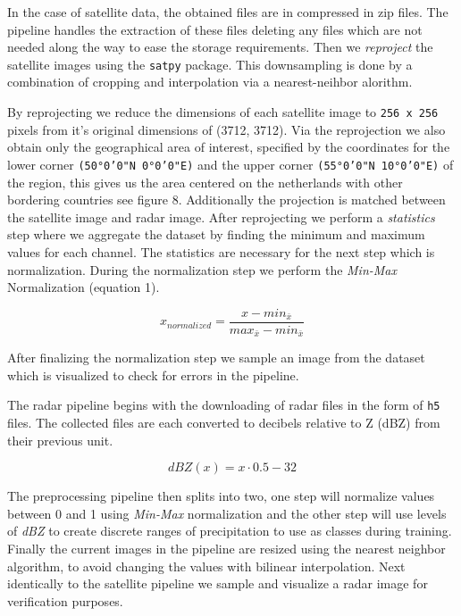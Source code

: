 In the case of satellite data, the obtained files are in compressed in zip files. The pipeline handles the extraction of these files deleting any files which are not needed along the way to ease the storage requirements.
Then we \textit{reproject} the satellite images using the \texttt{satpy} package. This downsampling is done by a combination of cropping and interpolation via a nearest-neihbor alorithm.

By reprojecting we reduce the dimensions of each satellite image to \texttt{256 x 256} pixels from it's original dimensions of (3712, 3712).
Via the reprojection we also obtain only the geographical area of interest, specified by the coordinates for the lower corner \texttt{(50°0'0"N 0°0'0"E)} and the upper corner \texttt{(55°0'0"N 10°0'0"E)} of the region, this gives us
the area centered on the netherlands with other bordering countries see figure 8.
Additionally the projection is matched between the satellite image and radar image.
After reprojecting we perform a \textit{statistics} step where we aggregate the dataset by finding the minimum and maximum values for each channel.
The statistics are necessary for the next step which is normalization. During the normalization step we perform the \textit{Min-Max} Normalization (equation 1).

\begin{equation}
  x_{normalized} = \frac{x-min_{\bar{x}}}{max_{\bar{x}}-min_{\bar{x}}}
\end{equation}

After finalizing the normalization step we sample an image from the dataset which is visualized to check for errors in the pipeline.

The radar pipeline begins with the downloading of radar files in the form of \texttt{h5} files. The collected files are each converted to decibels relative to Z (dBZ) from their previous unit.

\begin{equation}
  dBZ(x) = x \cdot 0.5 - 32
\end{equation}

The preprocessing pipeline then splits into two, one step will normalize values between 0 and 1 using \textit{Min-Max} normalization and the other step will use levels of \textit{dBZ} to create discrete ranges of precipitation to use as classes during training.
Finally the current images in the pipeline are resized using the nearest neighbor algorithm, to avoid changing the values with bilinear interpolation.
Next identically to the satellite pipeline we sample and visualize a radar image for verification purposes.


